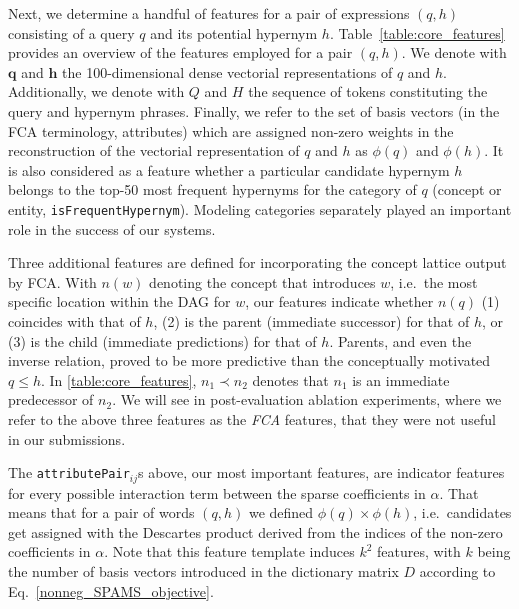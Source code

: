 \documentclass[11pt,a4paper]{article}
\begin{document}
Next, we determine a handful of features for a pair of expressions $(q, h)$
consisting of a query $q$ and its potential hypernym $h$.
Table~\ref{table:core_features} provides an overview of the features
employed for a pair $(q, h)$.
We denote with $\mathbf{q}$ and $\mathbf{h}$ the 100-dimensional dense
vectorial representations of $q$ and $h$.
Additionally, we denote with $Q$ and $H$ the sequence of tokens constituting
the query and hypernym phrases.
Finally, we refer to the set of basis vectors (in the FCA terminology,
attributes) which are assigned non-zero weights in the reconstruction of the
vectorial representation of $q$ and $h$ as $\phi(q)$ and $\phi(h)$.  
It is also considered as a feature whether a
particular candidate hypernym $h$ belongs to the top-50 most frequent hypernyms
for the category of $q$ (concept or entity, \texttt{isFrequentHypernym}).
Modeling categories separately played an important role in the success
of our systems.


Three additional features are defined for incorporating the concept lattice
output by FCA. With $n(w)$ denoting the concept that introduces $w$, i.e.~the
most specific location within the DAG for $w$, our features indicate whether
$n(q)$ 
(1) coincides with that of $h$,
(2) is the parent (immediate successor) for that of $h$, or
(3) is the child (immediate predictions) for that of $h$.
Parents, and even the inverse relation, proved to be more predictive
than the conceptually motivated  $q\le h$.
In \autoref{table:core_features}, $n_1\prec n_2$ denotes that $n_1$ is an
immediate predecessor of $n_2$.
We will see in post-evaluation ablation experiments, where we refer to the
above three features as the \emph{FCA} features, that they were not useful in
our submissions.



The \texttt{attributePair}$_{ij}$s above, our most important features, are 
indicator features for every possible interaction term 
between the sparse coefficients in $\alpha$. That means that for a pair of
words $(q, h)$ we defined $\phi(q) \times \phi(h)$, i.e.~candidates
get assigned with the Descartes product derived from the indices of the non-zero
coefficients in $\alpha$. Note that this feature template induces $k^2$
features, with $k$ being the number of basis vectors introduced in the dictionary matrix $D$ according to Eq.~\ref{nonneg_SPAMS_objective}.
\end{document}
